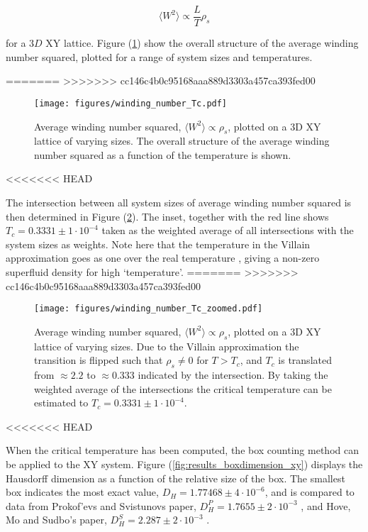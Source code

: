 \begin{equation}
    \langle W^2 \rangle \propto \frac{L}{T} \rho_s
\end{equation}

for a $3D$ XY lattice. Figure (\ref{fig:results_windingnumberTc}) show the overall structure of the average winding number squared, plotted for a range of system sizes and temperatures.

=======
>>>>>>> cc146c4b0c95168aaa889d3303a457ca393fed00
\begin{figure}[h!]
    \centering
        \texttt{[image: figures/winding\_number\_Tc.pdf]}
    \caption{Average winding number squared, $\langle W^2 \rangle \propto \rho_s$, plotted on a 3D XY lattice of varying sizes. The overall structure of the average winding number squared as a function of the temperature is shown.}
    \label{fig:results_windingnumberTc}
\end{figure}

<<<<<<< HEAD
\newpage

The intersection between all system sizes of average winding number squared is then determined in Figure (\ref{fig:results_windingnumberTcZoomed}). The inset, together with the red line shows $T_c = 0.3331 \pm 1 \cdot 10^{-4}$ taken as the weighted average of all intersections with the system sizes as weights. Note here that the temperature in the Villain approximation goes as one over the real temperature \cite{Villain:VillainOriginalPaper}, giving a non-zero superfluid density for high `temperature'.
=======
>>>>>>> cc146c4b0c95168aaa889d3303a457ca393fed00

\begin{figure}[h!]
    \centering
        \texttt{[image: figures/winding\_number\_Tc\_zoomed.pdf]}
    \caption{Average winding number squared, $\langle W^2 \rangle \propto \rho_s$, plotted on a 3D XY lattice of varying sizes. Due to the Villain approximation the transition is flipped such that $\rho_s \neq 0$ for $T > T_c$, and $T_c$ is translated from $\approx 2.2$ \cite{Gottlob:CritBehaviour3DXY} to $\approx 0.333$ indicated by the intersection. By taking the weighted average of the intersections the critical temperature can be estimated to $T_c = 0.3331 \pm 1 \cdot 10^{-4}$.}
    \label{fig:results_windingnumberTcZoomed}
\end{figure}

<<<<<<< HEAD
\newpage

When the critical temperature has been computed, the box counting method can be applied to the XY system. Figure (\ref{fig:results_boxdimension_xy}) displays the Hausdorff dimension as a function of the relative size of the box. The smallest box indicates the most exact value, $D_H = 1.77468 \pm 4 \cdot 10^{-6}$, and is compared to data from Prokof'evs and Svistunovs paper, $D_H^P = 1.7655 \pm 2 \cdot 10^{-3}$ \cite{Prokofev:comment_on_hove_hausdorff_crit_fluct}, and Hove, Mo and Sudbo's paper, $D_H^S = 2.287 \pm 2 \cdot 10^{-3}$ \cite{Hove:hausdorff_crit_fluctuations}.

